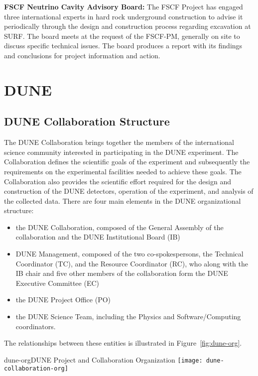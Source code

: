 \textbf{FSCF Neutrino Cavity Advisory Board:} The FSCF Project has engaged three international experts in hard rock underground construction to advise it periodically through the design and construction process regarding excavation at SURF. The board meets at the request of the FSCF-PM, generally on site to discuss specific technical issues. The board produces a report with its findings and conclusions for project information and action.

\section{DUNE}

\subsection{DUNE Collaboration Structure}

The DUNE Collaboration brings together the members of the international science community 
interested in participating in the DUNE experiment.  The Collaboration defines the scientific goals of the experiment and subsequently 
the requirements on the experimental facilities needed to achieve these goals.  The Collaboration also provides the scientific effort required for the design and construction of the DUNE detectors, operation of the experiment, and analysis of the 
collected data. There are four main elements in the DUNE organizational structure:  
\begin{itemize}
\item the DUNE Collaboration, composed of the General Assembly of the collaboration and the DUNE Institutional Board (IB)     
\item DUNE Management, composed of the two co-spokespersons, the Technical Coordinator (TC), and the Resource Coordinator (RC), who along
  with the IB chair and five other members of the collaboration form the DUNE Executive Committee (EC)
\item the DUNE Project Office (PO)
\item the DUNE Science Team, including the Physics and Software/Computing coordinators. 
\end{itemize}
The relationships between these entities is illustrated in Figure~\ref{fig:dune-org}.

\begin{cdrfigure}{dune-org}{DUNE Project and Collaboration Organization}
  \texttt{[image: dune-collaboration-org]}
\end{cdrfigure}

